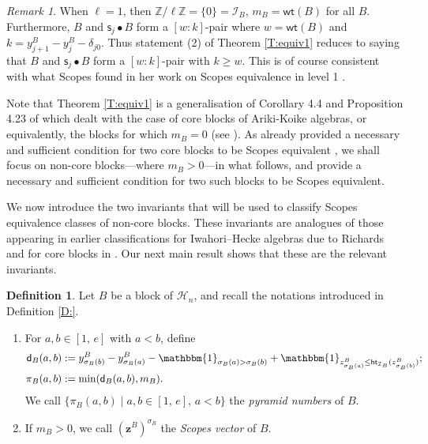 \documentclass[11pt,a4paper,reqno]{amsart}
\numberwithin{equation}{section}
\theoremstyle{plain}
\theoremstyle{definition}
\newtheorem{Def}[thm]{Definition}
\theoremstyle{remark}
\newtheorem{rem}[thm]{Remark}
\numberwithin{equation}{section}
\newcommand{\bbone}{\mathbbm{1}}
\newcommand{\bz}{\mathbf{z}}
\newcommand{\wt}{\mathsf{wt}}
\renewcommand{\min}{\mathrm{min}}
\newcommand{\ZZ}{\mathbb{Z}}
\newcommand{\cs}{\mathsf{s}}
\newcommand{\HH}{\mathcal{H}}
\newcommand{\DDot}[1]{\mathrel{\overset{#1}{\bullet}}}
\newcommand{\Ht}{\mathsf{ht}}
\newcommand{\II}{\mathcal{I}}
\newcommand{\dd}{\mathsf{d}}
\begin{document}
\begin{rem}
When $\ell = 1$, then $\ZZ/\ell\ZZ = \{0\} = \II_B$, $m_B = \wt(B)$ for all $B$.
Furthermore, $B$ and $\cs_j \DDot{} B$ form a $[w: k]$-pair where $w = \wt(B)$ and $k = y^B_{j+1} - y^B_j - \delta_{j0}$.  Thus statement (2) of Theorem \ref{T:equiv1} reduces to saying that $B$ and $\cs_j \DDot{} B$ form a $[w: k]$-pair with $k \geq w$. This is of course consistent with what Scopes found in her work on Scopes equivalence in level 1 \cite{Scopes}.
\end{rem}


Note that Theorem \ref{T:equiv1} is a generalisation of Corollary 4.4 and Proposition 4.23 of \cite{LQT} which dealt with the case of core blocks of Ariki-Koike algebras, or equivalently, the blocks for which $m_B = 0$ (see \cite[Theorem 3.17]{LQT}).
As \cite{LQT} already provided a necessary and sufficient condition for two core blocks to be Scopes equivalent \cite[Theorem 4.24]{LQT}, we shall focus on non-core blocks---where $m_B > 0$---in what follows, and provide a necessary and sufficient condition for two such blocks to be Scopes equivalent.


We now introduce the two invariants that will be used to classify Scopes equivalence classes of non-core blocks. 
These invariants are analogues of those appearing in earlier classifications for Iwahori–Hecke algebras due to Richards \cite{R} and for core blocks in \cite{LQT}.
Our next main result shows that these are the relevant invariants.

\begin{Def} \label{D:pyramid}
Let $B$ be a block of $\HH_n$, and recall the notations introduced in Definition \ref{D:}.
\begin{enumerate}
\item For $a, b \in [1,\, e]$ with $a < b$, define
\begin{align*}
\dd_B(a,b) &:= y^B_{\sigma_B(b)} - y^B_{\sigma_B(a)} - \bbone_{\sigma_B(a) > \sigma_B(b)}  + \bbone_{z^B_{\sigma_B(a)} \leq \Ht_{\II_B}(z^B_{\sigma_B(b)})}; \\
\pi_B(a,b) &:= \min(\dd_B(a,b), m_B).
\end{align*}
We call $\{ \pi_B(a,b) \mid a, b \in [1,\,e],\, a< b \}$ the {\em pyramid numbers} of $B$.

\item If $m_B > 0$, we call $(\bz^B)^{\sigma_B}$ the {\em Scopes vector} of $B$.
\end{enumerate}
\end{Def}
\end{document}
